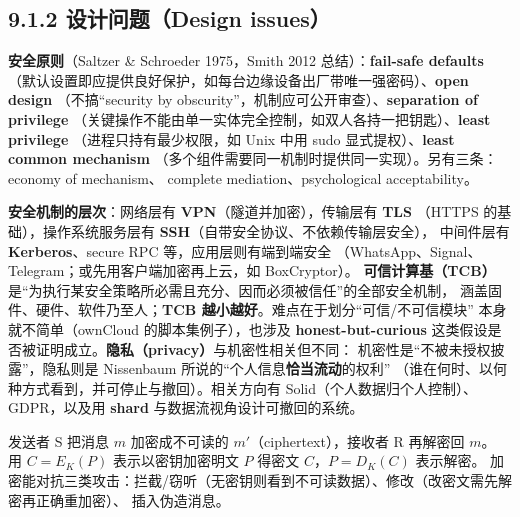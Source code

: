 
\subsection*{9.1.2 设计问题（Design issues）}
\textbf{安全原则}（Saltzer \& Schroeder 1975，Smith 2012 总结）：\textbf{fail-safe defaults}
（默认设置即应提供良好保护，如每台边缘设备出厂带唯一强密码）、\textbf{open design}
（不搞“security by obscurity”，机制应可公开审查）、\textbf{separation of privilege}
（关键操作不能由单一实体完全控制，如双人各持一把钥匙）、\textbf{least privilege}
（进程只持有最少权限，如 Unix 中用 sudo 显式提权）、\textbf{least common mechanism}
（多个组件需要同一机制时提供同一实现）。另有三条：economy of mechanism、
complete mediation、psychological acceptability。

\textbf{安全机制的层次}：网络层有 \textbf{VPN}（隧道并加密），传输层有 \textbf{TLS}
（HTTPS 的基础），操作系统服务层有 \textbf{SSH}（自带安全协议、不依赖传输层安全），
中间件层有 \textbf{Kerberos}、secure RPC 等，应用层则有端到端安全
（WhatsApp、Signal、Telegram；或先用客户端加密再上云，如 BoxCryptor）。
\textbf{可信计算基（TCB）}是“为执行某安全策略所必需且充分、因而必须被信任”的全部安全机制，
涵盖固件、硬件、软件乃至人；\textbf{TCB 越小越好}。难点在于划分“可信/不可信模块”
本身就不简单（ownCloud 的脚本集例子），也涉及 \textbf{honest-but-curious}
这类假设是否被证明成立。\textbf{隐私（privacy）}与机密性相关但不同：
机密性是“不被未授权披露”，隐私则是 Nissenbaum 所说的“个人信息\textbf{恰当流动}的权利”
（谁在何时、以何种方式看到，并可停止与撤回）。相关方向有 Solid（个人数据归个人控制）、
GDPR，以及用 \textbf{shard} 与数据流视角设计可撤回的系统。

\begin{closeread}
\end{closeread}



发送者 S 把消息 $m$ 加密成不可读的 $m'$（ciphertext），接收者 R 再解密回 $m$。
用 $C = E_K(P)$ 表示以密钥加密明文 $P$ 得密文 $C$，$P = D_K(C)$ 表示解密。
加密能对抗三类攻击：拦截/窃听（无密钥则看到不可读数据）、修改（改密文需先解密再正确重加密）、
插入伪造消息。

